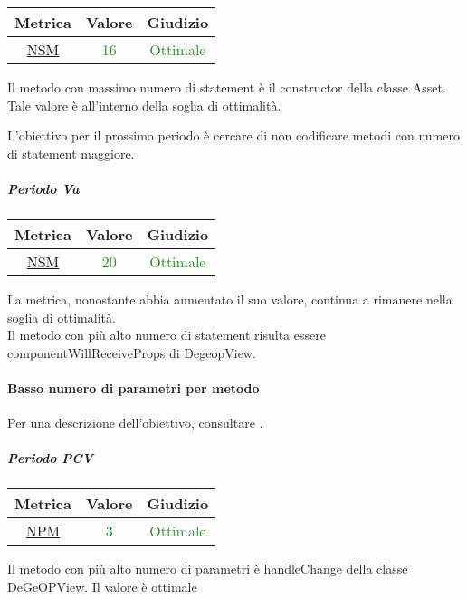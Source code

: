 			\begin{table}[H]
				\centering
				\begin{tabular}{  c | c | c}
					\hline
					\textbf{Metrica} & \textbf{Valore} & \textbf{Giudizio} \\
					\hline
					\hyperref[MMC]{NSM}   & \textcolor{ForestGreen}{16}          & \textcolor{ForestGreen}{Ottimale}  \\ \hline
				\end{tabular} 
			\end{table}
			Il metodo con massimo numero di statement è il constructor della classe Asset. Tale valore è all'interno della soglia di ottimalità.
			
			L'obiettivo per il prossimo periodo è cercare di non codificare metodi con numero di statement maggiore.
			
			\subparagraph{Periodo Va}
			
			\begin{table}[H]
				\centering
				\begin{tabular}{  c | c | c}
					\hline
					\textbf{Metrica} & \textbf{Valore} & \textbf{Giudizio} \\
					\hline
					\hyperref[MMC]{NSM}   & \textcolor{ForestGreen}{20}          & \textcolor{ForestGreen}{Ottimale}  \\ \hline
				\end{tabular} 
			\end{table}
			La metrica, nonostante abbia aumentato il suo valore, continua a rimanere nella soglia di ottimalità. \\
			Il metodo con più alto numero di statement risulta essere componentWillReceiveProps di DegeopView.
			
		\newpage
			\paragraph{Basso numero di parametri per metodo}
			Per una descrizione dell'obiettivo, consultare .
				\subparagraph{Periodo PCV}
				
				\begin{table}[H]
					\centering
					\begin{tabular}{  c | c | c}
						\hline
						\textbf{Metrica} & \textbf{Valore} & \textbf{Giudizio} \\
						\hline
						\hyperref[MMC]{NPM}   & \textcolor{ForestGreen}{3}          & \textcolor{ForestGreen}{Ottimale}  \\ \hline
					\end{tabular} 
				\end{table}
			Il metodo con più alto numero di parametri è handleChange della classe DeGeOPView. Il valore è ottimale
			
